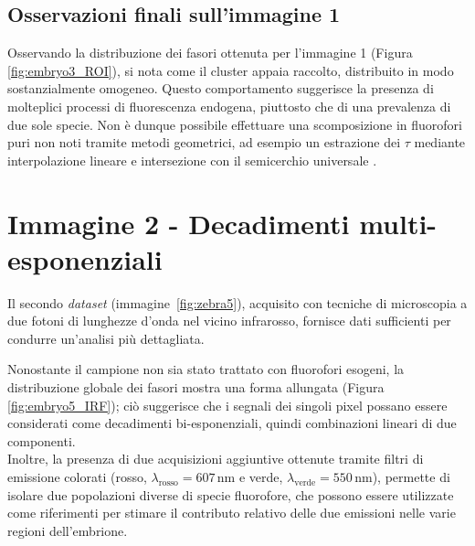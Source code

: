 \subsection{Osservazioni finali sull'immagine 1}

Osservando la distribuzione dei fasori ottenuta per l'immagine 1 (Figura \ref{fig:embryo3_ROI}), si nota come il cluster appaia raccolto, distribuito in modo sostanzialmente omogeneo. Questo comportamento suggerisce la presenza di molteplici processi di fluorescenza endogena, piuttosto che di una prevalenza di due sole specie. Non è dunque possibile effettuare una scomposizione in fluorofori puri non noti tramite metodi geometrici, ad esempio un estrazione dei $\tau$ mediante interpolazione lineare e intersezione con il semicerchio universale \cite{claytonGraphicalRepresentationMulticomponent2004}.



\section{Immagine 2 - Decadimenti multi-esponenziali}

Il secondo \textit{dataset} (immagine~\ref{fig:zebra5}), acquisito con tecniche di microscopia a due fotoni di lunghezze d'onda nel vicino infrarosso, fornisce dati sufficienti per condurre un'analisi più dettagliata.

Nonostante il campione non sia stato trattato con fluorofori esogeni, la distribuzione globale dei fasori mostra una forma allungata (Figura \ref{fig:embryo5_IRF}); ciò suggerisce che i segnali dei singoli pixel possano essere considerati come decadimenti bi-esponenziali, quindi combinazioni lineari di due componenti.\\
Inoltre, la presenza di due acquisizioni aggiuntive ottenute tramite filtri di emissione colorati (rosso, $\lambda_{\text{rosso}} = 607\,\mathrm{nm}$ e verde, $\lambda_{\text{verde}} = 550\,\mathrm{nm}$), permette di isolare due popolazioni diverse di specie fluorofore, che possono essere utilizzate come riferimenti per stimare il contributo relativo delle due emissioni nelle varie regioni dell'embrione.


